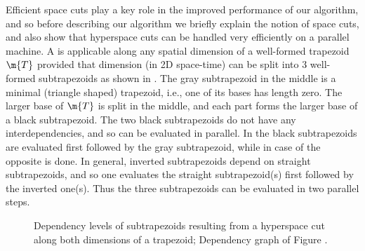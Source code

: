 Efficient space cuts play a key role in the improved
performance of our algorithm, and so before
describing our algorithm we briefly explain the
notion of space cuts, 
and also show that hyperspace cuts 
can be handled very efficiently on a parallel machine.
%
A  is applicable along any 
spatial dimension of a well-formed trapezoid $\m{T}$ 
provided that dimension (in 2D space-time) can be split 
into 3 well-formed subtrapezoids as shown in 
. 
The gray subtrapezoid in the middle is a minimal
(triangle shaped) trapezoid, i.e., one of its bases has
length zero. The larger base of $\m{T}$ is split
in the middle, and each part forms the larger
base of a black subtrapezoid.
The two black subtrapezoids do not have
any interdependencies, and so can be evaluated
in parallel. In 
the black subtrapezoids are evaluated first
followed by the gray subtrapezoid, while in case of
 the opposite
is done. In general,
inverted subtrapezoids depend on straight
subtrapezoids, and so
one evaluates the straight subtrapezoid(s) first
followed by the inverted one(s).
Thus the three subtrapezoids can be
evaluated in two parallel steps.

\begin{figure}
\centering

\hspace{2cm}
 \vspace{-0.3cm}
 \caption{ Dependency levels of subtrapezoids 
 resulting from a hyperspace cut along both dimensions
 of a trapezoid;
  Dependency graph of Figure .}%
 \label{fig:sim-space-cut}%
\end{figure}%


